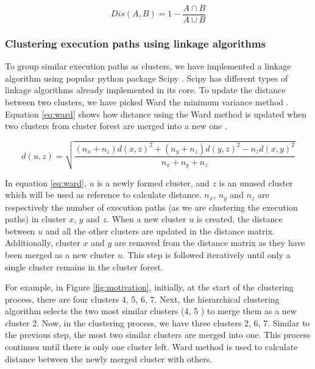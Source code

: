 \begin{equation}
Dis(A, B) = 1 - \frac{A\cap B}{A\cup B}
\label{eq:jaccard}
\end{equation}

\subsubsection{Clustering execution paths using linkage algorithms}

To group similar execution paths as clusters, we have implemented a linkage algorithm using popular python package Scipy \cite{scipy}. Scipy has different types of linkage algorithms already implemented in its core. To update the distance between two clusters, we have picked Ward the minimum variance method \cite{ward}. Equation \ref{eq:ward} shows how distance using the Ward method is updated when two clusters from cluster forest are merged into a new one \cite{scipy}.

\begin{equation}
     d(u, z) =   \sqrt{\frac{(n_x+n_z)d(x,z)^2+ (n_y+n_z)d(y,z)^2 - n_z d(x,y)^2 }{n_x+n_y+n_z}}
    \label{eq:ward}
\end{equation}

 
In equation \ref{eq:ward}, $u$ is a newly formed cluster, and $z$ is an unused cluster which will be used as reference to calculate distance. $n_x$, $n_y$ and $n_z$ are respectively the number of execution paths (as we are clustering the execution paths) in cluster $x$, $y$ and $z$.
When a new cluster $u$ is created, the distance between $u$ and all the other clusters are updated in the distance matrix. Additionally, cluster $x$ and $y$ are removed from the distance matrix as they have been merged as a new cluster $u$. This step is followed iteratively until only a single cluster remains in the cluster forest. 

For example, in Figure \ref{fig:motivation}, initially, at the start of the clustering process, there are four clusters 4, 5, 6, 7. Next, the hierarchical clustering algorithm selects the two most similar clusters (4, 5 ) to merge them as a new cluster 2. Now, in the clustering process, we have three clusters 2, 6, 7. Similar to the previous step, the most two similar clusters are merged into one. This process continues until there is only one cluster left. Ward method is used to calculate distance between the newly merged cluster with others.

